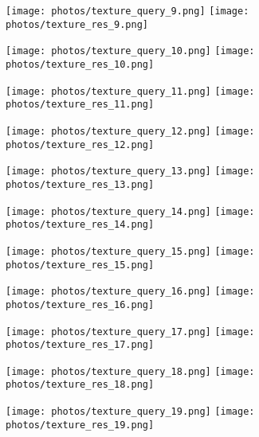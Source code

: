 \documentclass{article}
\begin{document}
\begin{figure}[!ht]
\centering
\texttt{[image: photos/texture\_query\_9.png]}
\texttt{[image: photos/texture\_res\_9.png]}
\end{figure}

\begin{figure}[!ht]
\centering
\texttt{[image: photos/texture\_query\_10.png]}
\texttt{[image: photos/texture\_res\_10.png]}
\end{figure}

\begin{figure}[!ht]
\centering
\texttt{[image: photos/texture\_query\_11.png]}
\texttt{[image: photos/texture\_res\_11.png]}
\end{figure}

\begin{figure}[!ht]
\centering
\texttt{[image: photos/texture\_query\_12.png]}
\texttt{[image: photos/texture\_res\_12.png]}
\end{figure}

\begin{figure}[!ht]
\centering
\texttt{[image: photos/texture\_query\_13.png]}
\texttt{[image: photos/texture\_res\_13.png]}
\end{figure}

\begin{figure}[!ht]
\centering
\texttt{[image: photos/texture\_query\_14.png]}
\texttt{[image: photos/texture\_res\_14.png]}
\end{figure}

\begin{figure}[!ht]
\centering
\texttt{[image: photos/texture\_query\_15.png]}
\texttt{[image: photos/texture\_res\_15.png]}
\end{figure}

\begin{figure}[!ht]
\centering
\texttt{[image: photos/texture\_query\_16.png]}
\texttt{[image: photos/texture\_res\_16.png]}
\end{figure}

\begin{figure}[!ht]
\centering
\texttt{[image: photos/texture\_query\_17.png]}
\texttt{[image: photos/texture\_res\_17.png]}
\end{figure}

\begin{figure}[!ht]
\centering
\texttt{[image: photos/texture\_query\_18.png]}
\texttt{[image: photos/texture\_res\_18.png]}
\end{figure}

\begin{figure}[!ht]
\centering
\texttt{[image: photos/texture\_query\_19.png]}
\texttt{[image: photos/texture\_res\_19.png]}
\end{figure}
\end{document}
